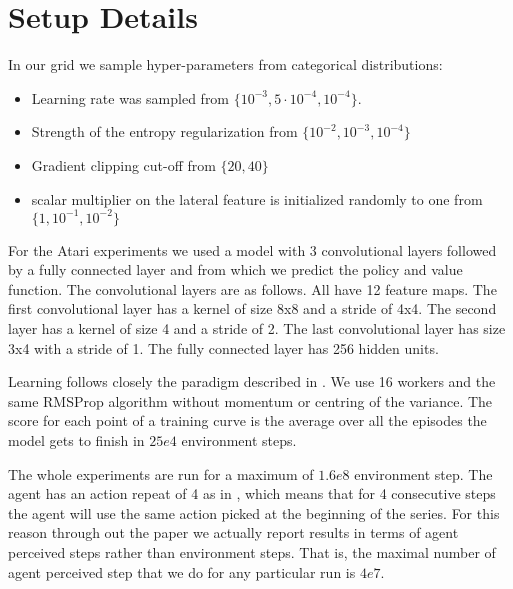 \section{Setup Details}
\label{sec:appendix_jobs_detail}

In our grid we sample hyper-parameters from categorical distributions:
\begin{itemize}
  \item Learning rate was sampled from $\{10^{-3}, 5\cdot 10^{-4}, 10^{-4}\}$.
  \item Strength of the entropy regularization from $\{10^{-2}, 10^{-3}, 10^{-4}\}$
  \item Gradient clipping cut-off from $\{20, 40\}$
  \item scalar multiplier on the lateral feature is initialized randomly to one from $\{1, 10^{-1}, 10^{-2}\}$
\end{itemize}

For the Atari experiments we used a model with 3 convolutional layers followed by a fully connected
layer and from which we predict the policy and value function. The convolutional layers are as
follows. All have 12 feature maps. The first convolutional layer has a kernel of size 8x8 and a stride
of 4x4. The second layer has a kernel of size 4 and a stride of 2. The last convolutional layer has
size 3x4 with a stride of 1.  The fully connected layer has 256 hidden units.

Learning follows closely the paradigm described in \citep{mnih2016a3c}. We use 16 workers and the
same RMSProp algorithm without momentum or centring of the variance. The score for each point of
a training curve is the average over all the episodes the model gets to finish in $25e4$ environment steps.

The whole experiments are run for a maximum of $1.6e8$ environment step. The agent has an action repeat of 4 as
in \cite{mnih2016a3c}, which means that for 4 consecutive steps the agent will use the same action picked at the
beginning of the series. For this reason through out the paper we actually report results in terms of agent
perceived steps rather than environment steps. That is, the maximal number of agent perceived step that we do
for any particular run is $4e7$.
